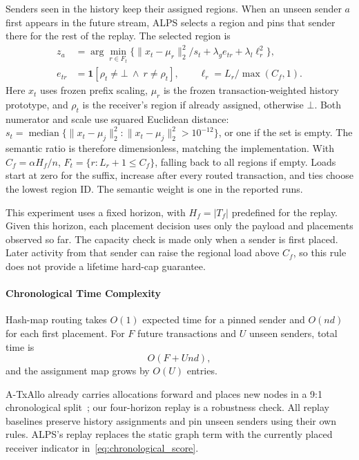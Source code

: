 \documentclass[conference,letterpaper]{IEEEtran}
\begin{document}
Senders seen in the history keep their assigned regions. When an unseen
sender $a$ first appears in the future stream, ALPS selects a region and pins
that sender there for the rest of the replay. The selected region is
\begin{equation}
\label{eq:chronological_score}
\begin{aligned}
z_a&=\arg\min_{r\in F_t}\{\|x_t-\mu_r\|_2^2/s_t+\lambda_g e_{tr}
 +\lambda_l\ell_r^2\},\\
e_{tr}&=\mathbf{1}[\rho_t\neq\bot\ \land\ r\neq\rho_t],\qquad
\ell_r=L_r/\max(C_f,1).
\end{aligned}
\end{equation}
Here $x_t$ uses frozen prefix scaling, $\mu_r$ is the frozen
transaction-weighted history prototype, and $\rho_t$ is the receiver's region
if already assigned, otherwise $\bot$. Both numerator and scale use squared
Euclidean distance: $s_t=\operatorname{median}\{\|x_t-\mu_j\|_2^2:
\|x_t-\mu_j\|_2^2>10^{-12}\}$, or one if the set is empty. The semantic
ratio is therefore dimensionless, matching the implementation.
With $C_f=\alpha H_f/n$, $F_t=\{r:L_r+1\leq C_f\}$, falling back to all
regions if empty. Loads start at zero for the suffix, increase after every
routed transaction, and ties choose the lowest region ID. The semantic weight
is one in the reported runs.

This experiment uses a fixed horizon, with $H_f=|T_f|$ predefined for the
replay. Given this horizon, each placement decision uses only the payload and
placements observed so far. The capacity check is made only when a sender is
first placed. Later activity from that sender can raise the regional load above
$C_f$, so this rule does not provide a lifetime hard-cap guarantee.

\paragraph{Chronological Time Complexity}
Hash-map routing takes $O(1)$ expected time for a pinned sender and $O(nd)$
for each first placement. For $F$ future transactions and $U$ unseen senders,
total time is
\begin{equation}
\label{eq:online_complexity}
O(F+Und),
\end{equation}
and the assignment map grows by $O(U)$ entries.

A-TxAllo already carries allocations forward and places new nodes in a 9:1
chronological split~\cite{txallo2023}; our four-horizon replay is a robustness
check. All replay baselines preserve history assignments and pin unseen senders
using their own rules. ALPS's replay replaces the static graph term with the
currently placed receiver indicator in~\eqref{eq:chronological_score}.
\end{document}
